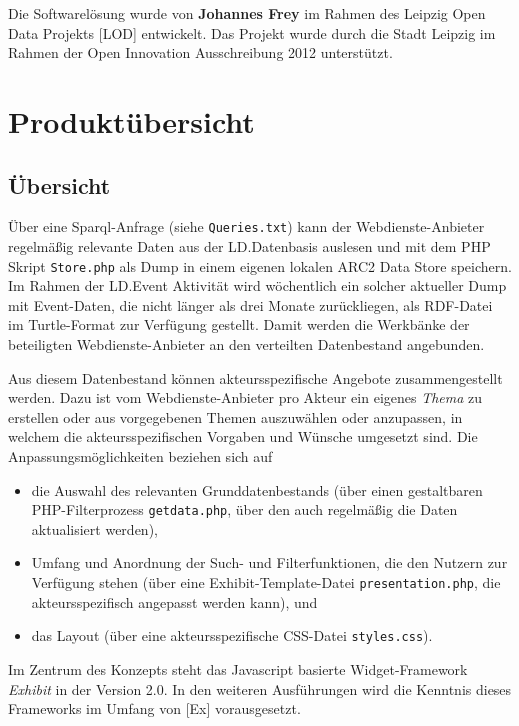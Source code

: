 \documentclass[11pt,a4paper]{article}
\begin{document}
Die Softwarelösung wurde von \textbf{Johannes Frey} im Rahmen des Leipzig Open
Data Projekts [LOD] entwickelt. Das Projekt wurde durch die Stadt Leipzig im
Rahmen der Open Innovation Ausschreibung 2012 unterstützt.

\section{Produktübersicht}

\subsection{Übersicht}

Über eine Sparql-Anfrage (siehe \texttt{Queries.txt}) kann der
Webdienste-Anbieter regelmäßig relevante Daten aus der LD.Datenbasis auslesen
und mit dem PHP Skript \texttt{Store.php} als Dump in einem eigenen lokalen
ARC2 Data Store speichern. Im Rahmen der LD.Event Aktivität wird wöchentlich
ein solcher aktueller Dump mit Event-Daten, die nicht länger als drei Monate
zurückliegen, als RDF-Datei im Turtle-Format zur Verfügung gestellt. Damit
werden die {\glqq}Werkbänke{\grqq} der beteiligten Webdienste-Anbieter an den
verteilten Datenbestand angebunden.

Aus diesem Datenbestand können akteursspezifische Angebote zusammengestellt
werden.  Dazu ist vom Webdienste-Anbieter pro Akteur ein eigenes \emph{Thema}
zu erstellen oder aus vorgegebenen Themen auszuwählen oder anzupassen, in
welchem die akteursspezifischen Vorgaben und Wünsche umgesetzt sind.  Die
Anpassungsmöglichkeiten beziehen sich auf
\begin{itemize}
\item die Auswahl des relevanten Grunddatenbestands (über einen gestaltbaren
  PHP-Filter\-prozess \texttt{getdata.php}, über den auch regelmäßig die Daten
  aktualisiert werden),
\item Umfang und Anordnung der Such- und Filterfunktionen, die den Nutzern zur
  Verfügung stehen (über eine Exhibit-Template-Datei
  \texttt{presentation.php}, die akteursspezifisch angepasst werden kann), und
\item das Layout (über eine akteursspezifische CSS-Datei \texttt{styles.css}). 
\end{itemize}
Im Zentrum des Konzepts steht das Javascript basierte Widget-Framework
\emph{Exhibit} in der Version 2.0. In den weiteren Ausführungen wird die
Kenntnis dieses Frameworks im Umfang von [Ex] vorausgesetzt.
\end{document}
